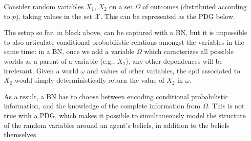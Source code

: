 \documentclass{article}
\theoremstyle{plain}
\theoremstyle{definition}
\newenvironment{example}
	{\pushQED{\qed}\renewcommand{\qedsymbol}{$\triangle$}\examplex}
	{\popQED\endexamplex%
}
\theoremstyle{remark}
\numberwithin{equation}{section}
\begin{document}
	\begin{example}\label{ex:randomvars}
		Consider random variables $X_1$, $X_2$  on a set
                $\Omega$ of outcomes (distributed according to $p$),
                taking values in the set $\mathcal X$. This can be
                represented as the PDG below. 
		\begin{center}
		\end{center}
		The setup so far, in black above, can be captured with a BN, but it is impossible to also articulate conditional probabilistic relations amongst the variables in the same time: in a BN, once we add a variable $\Omega$ which caracterizes all possible worlds as a parent of a variable (e.g., $X_2$), any other dependences will be irrelevant. Given a world $\omega$ and values of other variables, the cpd associated to $X_2$ would simply deterministically return the value of $X_2$ in $\omega$. 
		
		As a result, a BN has to choose between encoding conditional probabilistic information, and the knowledge of the complete information from $\Omega$. This is not true with a PDG, which makes it possible to simultaneously model the structure of the random variables around an agent's beliefs, in addition to the beliefs themselves.
	\end{example}
\end{document}
